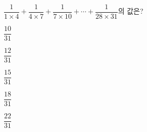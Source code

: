 \hspace*{2mm}\begin{minipage}[t]{\dimexpr\linewidth-2mm\relax}\vspace{0pt}
$\dfrac{1}{1\times 4}+\dfrac{1}{4\times 7}+\dfrac{1}{7\times 10}+\cdots+\dfrac{1}{28\times 31}$의 값은?
\begin{choices32}{\rule[-3ex]{0pt}{8ex}$\dfrac{10}{31}$}{\rule[-3ex]{0pt}{8ex}$\dfrac{12}{31}$}{\rule[-3ex]{0pt}{8ex}$\dfrac{15}{31}$}{\rule[-3ex]{0pt}{8ex}$\dfrac{18}{31}$}{\rule[-3ex]{0pt}{8ex}$\dfrac{22}{31}$}\end{choices32}\end{minipage}

